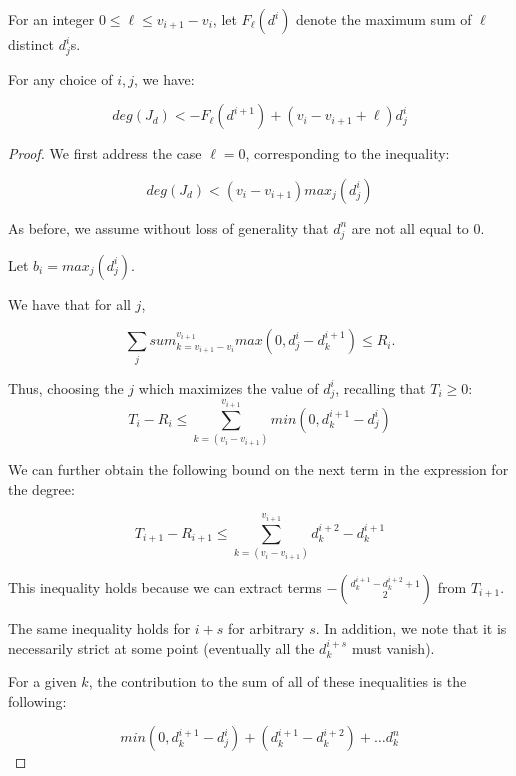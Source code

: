 \documentclass[10pt,a4paper]{amsart}
\begin{document}
\begin{lem}
For an integer $0\leq \ell \leq v_{i+1}-v_i$, let $F_\ell(d^{i})$ denote the maximum sum of $\ell$ distinct $d^i_j$s.

For any choice of $i,j$, we have: 

$$deg(J_d)< -F_\ell(d^{i+1})+(v_{i}-v_{i+1}+\ell)d^i_j$$
    
    


\end{lem}

\begin{proof}

We first address the case $\ell=0$, corresponding to the inequality:

$$deg(J_d)< (v_{i}-v_{i+1})max_j(d^i_j)$$


As before, we assume without loss of generality that $d^n_j$ are not all equal to 0.

Let $b_{i}=max_j(d^{i}_j)$. 

We have that for all $j$, 

\begin{equation}
    \label{master}
    \sum_j sum_{k=v_{i+1}-v_i}^{v_{i+1}} max(0,d^{i}_j-d^{i+1}_k)\leq R_i. 
\end{equation}

Thus, choosing the $j$ which maximizes the value of $d^i_j$, recalling that $T_i\geq 0$:
\begin{equation}
    \label{grn1}
    T_i-R_i\leq \sum_{k=(v_{i}-v_{i+1})}^{v_{i+1}}min(0,d^{i+1}_k-d^i_j)
\end{equation}


We can further obtain the following bound on the next term in the expression for the degree:

\begin{equation}
    \label{grn2}
    T_{i+1}-R_{i+1}\leq \sum_{k=(v_{i}-v_{i+1})}^{v_{i+1}}d^{i+2}_k-d^{i+1}_k
\end{equation}

This inequality holds because we can extract terms $-\binom{d^{i+1}_k-d^{i+2}_k+1}{2}$ from $T_{i+1}$.

The same inequality holds for $i+s$ for arbitrary $s$. In addition, we note that it is necessarily strict at some point (eventually all the $d^{i+s}_k$ must vanish).

For a given $k$, the contribution to the sum of all of these inequalities is the following:


$$min(0,d^{i+1}_k-d^i_j)+(d^{i+1}_k-d^{i+2}_k)+\dots d^n_k$$




\end{proof}
\end{document}
